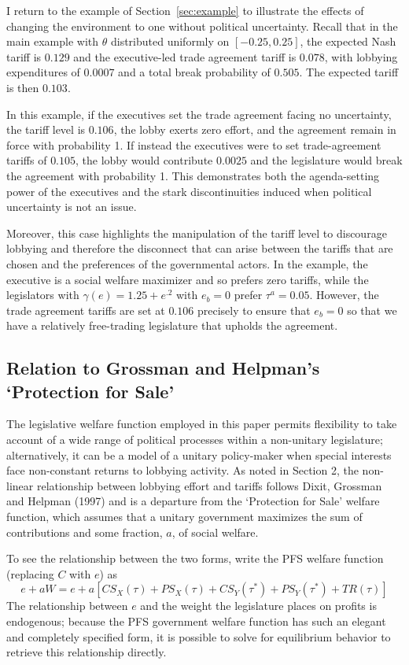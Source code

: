 \documentclass[10pt]{article}
\newcommand{\ve}{\theta}
\newcommand{\ga}{\gamma}
\begin{document}
I return to the example of Section~\ref{sec:example} to illustrate the effects of changing the environment to one without political uncertainty. Recall that in the main example with $\ve$ distributed uniformly on $[-0.25,0.25]$, the expected Nash tariff is $0.129$ and the executive-led trade agreement tariff is $0.078$, with lobbying expenditures of $0.0007$ and a total break probability of $0.505$. The expected tariff is then $0.103$.

In this example, if the executives set the trade agreement facing no uncertainty, the tariff level is $0.106$, the lobby exerts zero effort, and the agreement remain in force with probability 1. If instead the executives were to set trade-agreement tariffs of $0.105$, the lobby would contribute $0.0025$ and the legislature would break the agreement with probability 1. This demonstrates both the agenda-setting power of the executives and the stark discontinuities induced when political uncertainty is not an issue.

Moreover, this case highlights the manipulation of the tariff level to discourage lobbying and therefore the disconnect that can arise between the tariffs that are chosen and the preferences of the governmental actors. In the example, the executive is a social welfare maximizer and so prefers zero tariffs, while the legislators with $\ga(e) = 1.25 + e^{.2}$ with $e_b = 0$ prefer $\tau^a = 0.05$. However, the trade agreement tariffs are set at $0.106$ precisely to ensure that $e_b =0$ so that we have a relatively free-trading legislature that upholds the agreement.


\subsection{Relation to Grossman and Helpman's `Protection for Sale'}
\label{sec:gh}
The legislative welfare function employed in this paper permits flexibility to take account of a wide range of political processes within a non-unitary legislature; alternatively, it can be a model of a unitary policy-maker when special interests face non-constant returns to lobbying activity. As noted in Section 2, the non-linear relationship between lobbying effort and tariffs follows Dixit, Grossman and Helpman (1997) and is a departure from the `Protection for Sale' welfare function, which assumes that a unitary government maximizes the sum of contributions and some fraction, $a$, of social welfare.

To see the relationship between the two forms, write the PFS welfare function (replacing $C$ with $e$) as
\[
  e + aW = e + a \left[ \mathit{CS}_X(\tau) + \mathit{PS}_X(\tau) + \mathit{CS}_Y(\tau^*) + \mathit{PS}_Y(\tau^*) + \mathit{TR}(\tau) \right]
\]
The relationship between $e$ and the weight the legislature places on profits is endogenous; because the PFS government welfare function has such an elegant and completely specified form, it is possible to solve for equilibrium behavior to retrieve this relationship directly.
\end{document}
